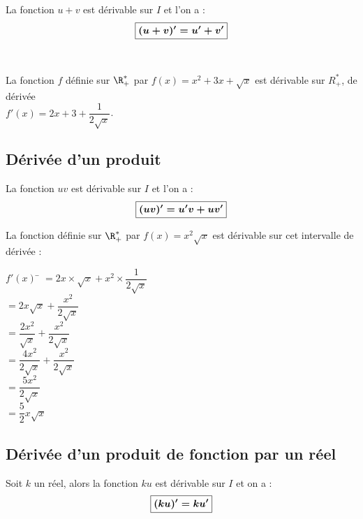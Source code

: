 \documentclass[a4paper,11pt,cours]{nsi} %
\begin{document}
\begin{propriete}[]
	La fonction $u+v$ est dérivable sur $I$ et l'on a :$${\boldmath\boxed{(u+v)'=u'+v'}}$$
\end{propriete}
\begin{demonstration}
	\\	
    \newpage
\end{demonstration}

\begin{exemple}[]
	La fonction $f$ définie sur $\R^*_+$ par $f(x)=x^2+3x+\sqrt{x}$ est dérivable sur $R^*_+$, de dérivée\\ $f'(x)=2x+3+\dfrac{1}{2\sqrt{x}}$.
\end{exemple}

\subsection{Dérivée d'un produit}

\begin{propriete}[] 
	La fonction $uv$ est dérivable sur $I$ et l'on a :$${\boldmath\boxed{(uv)'=u'v+uv'}}$$
\end{propriete}
\begin{demonstration}
\end{demonstration}

\begin{exemple}
	La fonction définie sur $\R^*_+$ par $f(x)=x^2\sqrt{x}$ est dérivable sur cet intervalle de dérivée :
	\begin{tabbing}
		$f'(x)$	\=	$=2x\times \sqrt{x}+x^2\times \dfrac{1}{2\sqrt{x}}$\\
		\>	$=2x\sqrt{x}+\dfrac{x^2}{2\sqrt{x}}$\\
		\>	$=\dfrac{2x^2}{\sqrt{x}}+\dfrac{x^2}{2\sqrt{x}}$\\
		\>	$=\dfrac{4x^2}{2\sqrt{x}}+\dfrac{x^2}{2\sqrt{x}}$\\
		\>	$=\dfrac{5x^2}{2\sqrt{x}}$\\
		\>	$=\dfrac{5}{2}x\sqrt{x}$
	\end{tabbing}
\end{exemple}
\subsection{Dérivée d'un produit de fonction par un réel}
\begin{propriete}[]
	Soit $k$ un réel, alors la fonction $ku$ est dérivable sur $I$ et on a :$${\boldmath\boxed{(ku)'=ku'}}$$
\end{propriete}
\begin{demonstration}
\end{demonstration}	
\end{document}
